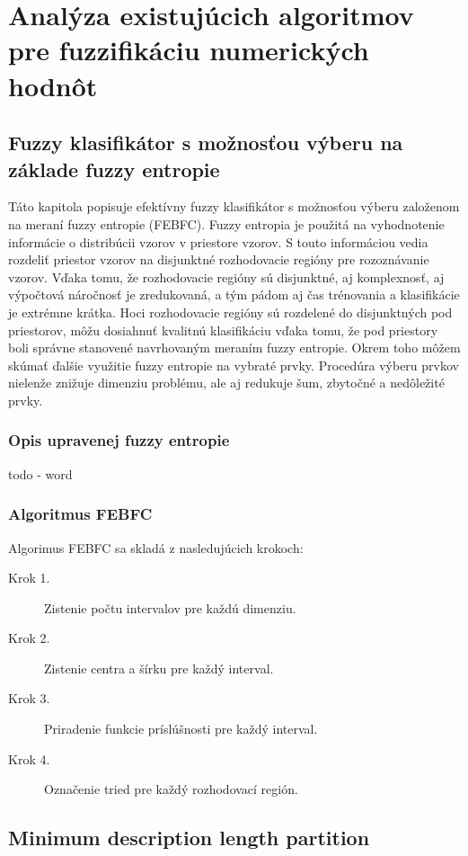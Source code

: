 \chapter{Analýza existujúcich algoritmov pre fuzzifikáciu numerických hodnôt} 

\section{Fuzzy klasifikátor s možnosťou výberu na základe fuzzy entropie }

Táto kapitola popisuje efektívny fuzzy klasifikátor s možnosťou výberu založenom na meraní fuzzy entropie (FEBFC).
Fuzzy entropia je použitá na vyhodnotenie informácie o distribúcii vzorov v priestore vzorov. S touto informáciou vedia rozdeliť priestor vzorov na disjunktné rozhodovacie regióny pre rozoznávanie vzorov. Vďaka tomu, že rozhodovacie regióny sú disjunktné, aj komplexnosť, aj výpočtová náročnosť je zredukovaná, a tým pádom aj čas trénovania a klasifikácie je extrémne krátka. Hoci rozhodovacie regióny sú rozdelené do disjunktných pod priestorov, môžu dosiahnuť kvalitnú klasifikáciu vďaka tomu, že pod priestory boli správne stanovené navrhovaným meraním fuzzy entropie. Okrem toho môžem skúmať ďalšie využitie fuzzy entropie na vybraté prvky. Procedúra výberu prvkov nielenže znižuje dimenziu problému, ale aj redukuje šum, zbytočné a nedôležité prvky. 
\subsection{Opis upravenej fuzzy entropie}

todo - word
\subsection{Algoritmus FEBFC}
Algorimus FEBFC sa skladá z nasledujúcich krokoch: 
\begin{description}
	\item[Krok 1.] Zistenie počtu intervalov pre každú dimenziu. 
	\item[Krok 2.] Zistenie centra a šírku pre každý interval.
	\item[Krok 3.] Priradenie funkcie príslúšnosti pre každý interval. 
	\item[Krok 4.] Označenie tried pre každý rozhodovací región.   

\end{description}

\section{Minimum description length partition}	

